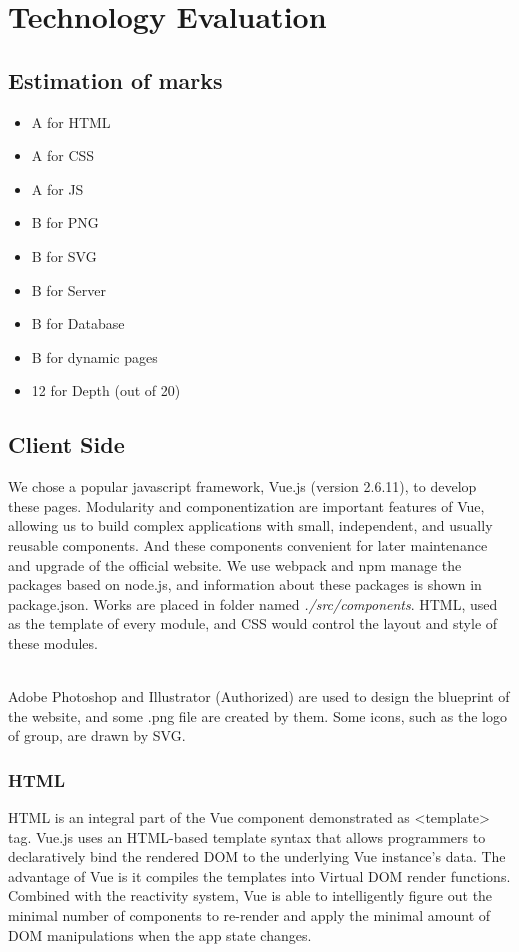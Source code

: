 \documentclass{article}
\begin{document}
\section{Technology Evaluation}
\subsection{Estimation of marks}
\begin{itemize}
    \item A for HTML
    \item A for CSS
    \item A for JS
    \item B for PNG
    \item B for SVG
    \item B for Server
    \item B for Database
    \item B for dynamic pages
    \item 12 for Depth (out of 20)
\end{itemize} 

\subsection{Client Side}
We chose a popular javascript framework, Vue.js (version 2.6.11), to 
develop these pages.
Modularity and componentization are important features of Vue,  
allowing us to build complex applications with small, independent, 
and usually reusable components. And these components convenient 
for later maintenance and upgrade of the official website. 
We use webpack and npm manage the packages based on node.js, and 
information about these packages is shown in package.json. Works are 
placed in folder named \textit{./src/components}. HTML, used as 
the template of every module, and CSS would control the layout 
and style of these modules.

~\\
\noindent
Adobe Photoshop and Illustrator (Authorized) are used to design the 
blueprint of the website, and some .png file are created by them. 
Some icons, such as the logo of group, are drawn by SVG.

\subsubsection{HTML}
HTML is an integral part of the Vue component demonstrated as \textless template\textgreater \space
tag. 
Vue.js uses an HTML-based template syntax that allows programmers to declaratively 
bind the rendered DOM to the underlying Vue instance’s data. The advantage of Vue 
is it compiles the templates into Virtual DOM render functions. Combined with the 
reactivity system, Vue is able to intelligently figure out the minimal number of 
components to re-render and apply the minimal amount of DOM manipulations when the 
app state changes.
\end{document}
